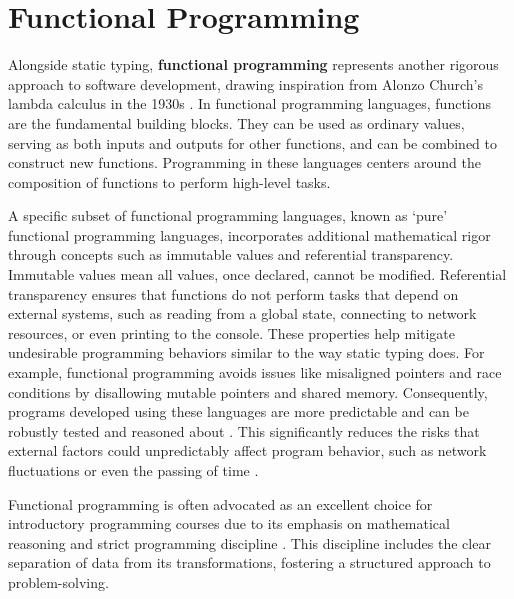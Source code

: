 \section{Functional Programming}
\label{sec:paradigm}
Alongside static typing, \textbf{functional programming} represents another rigorous approach to software development, drawing inspiration from Alonzo Church's lambda calculus in the 1930s \cite{Church1985-bx}. In functional programming languages, functions are the fundamental building blocks. They can be used as ordinary values, serving as both inputs and outputs for other functions, and can be combined to construct new functions. Programming in these languages centers around the composition of functions to perform high-level tasks. 

 A specific subset of functional programming languages, known as `pure' functional programming languages, incorporates additional mathematical rigor through concepts such as immutable values and referential transparency. Immutable values mean all values, once declared, cannot be modified. Referential transparency ensures that functions do not perform tasks that depend on external systems, such as reading from a global state, connecting to network resources, or even printing to the console.  These properties help mitigate undesirable programming behaviors similar to the way static typing does. For example, functional programming avoids issues like misaligned pointers and race conditions by disallowing mutable pointers and shared memory. Consequently, programs developed using these languages are more predictable and can be robustly tested and reasoned about \cite{Hu2015-ch}. This significantly reduces the risks that external factors could unpredictably affect program behavior, such as network fluctuations or even the passing of time \cite{Suzuki2019-bi}.

Functional programming is often advocated as an excellent choice for introductory programming courses due to its emphasis on mathematical reasoning and strict programming discipline \cite{Joosten1993-be, Chakravarty2004-ux}. This discipline includes the clear separation of data from its transformations, fostering a structured approach to problem-solving.


